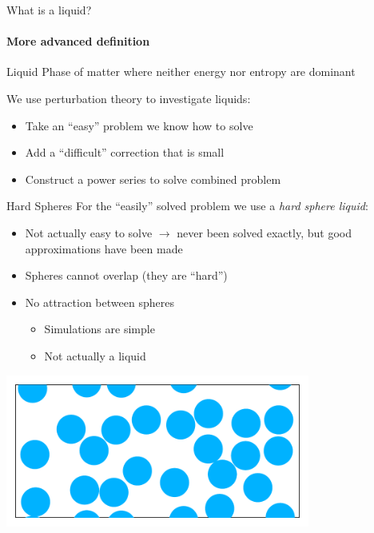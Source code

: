 \documentclass[xcolor=dvipsnames]{beamer}
\begin{document}
\begin{frame}{What is a liquid?}
  \framesubtitle{More advanced definition}
  \begin{block}{Liquid}
    Phase of matter where neither energy nor entropy are dominant
  \end{block}

  We use perturbation theory to investigate liquids:
  \begin{itemize}
    \item Take an ``easy'' problem we know how to solve
    \item Add a ``difficult'' correction that is small
    \item Construct a power series to solve combined problem
  \end{itemize}
\end{frame}

\begin{frame}{Hard Spheres}
  For the ``easily'' solved problem we use a \emph{hard sphere liquid}:
  \begin{itemize}
    \item Not actually easy to solve $\rightarrow$ never been solved exactly, but good approximations have been made
    \item Spheres cannot overlap (they are ``hard'')
    \item No attraction between spheres
      \begin{itemize}
        \item<1->Simulations are simple
        \item<2->Not actually a liquid
      \end{itemize}
  \end{itemize}
  \begin{center}
    \includegraphics[width=0.75\textwidth]{figs/hard-spheres}
  \end{center}
\end{frame}
\end{document}
